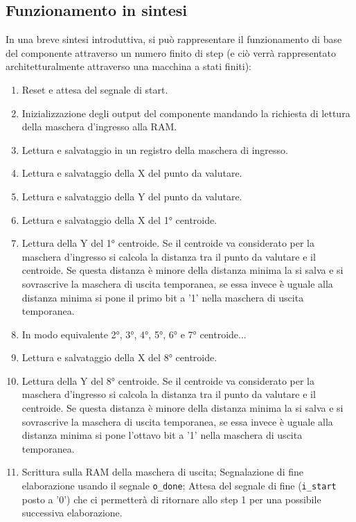 \documentclass{article}
\begin{document}
\subsection{Funzionamento in sintesi}
In una breve sintesi introduttiva, si può rappresentare il funzionamento di base del componente attraverso un numero finito di step (e ciò verrà rappresentato architetturalmente attraverso una macchina a stati finiti):
\begin{enumerate}
    \item Reset e attesa del segnale di start.
    \item Inizializzazione degli output del componente mandando la richiesta di lettura della maschera d'ingresso alla RAM.
    \item Lettura e salvataggio in un registro della maschera di ingresso.
    \item Lettura e salvataggio della X del punto da valutare.
    \item Lettura e salvataggio della Y del punto da valutare.
    \item Lettura e salvataggio della X del 1° centroide.
    \item Lettura della Y del 1° centroide. Se il centroide va considerato per la maschera d'ingresso si calcola la distanza tra il punto da valutare e il centroide. Se questa distanza è minore della distanza minima la si salva e si sovrascrive la maschera di uscita temporanea, se essa invece è uguale alla distanza minima si pone il primo bit a '1' nella maschera di uscita temporanea.
    \item In modo equivalente 2°, 3°, 4°, 5°, 6° e 7° centroide... \addtocounter{enumi}{11}
    \item Lettura e salvataggio della X del 8° centroide.
    \item Lettura della Y del 8° centroide. Se il centroide va considerato per la maschera d'ingresso si calcola la distanza tra il punto da valutare e il centroide. Se questa distanza è minore della distanza minima la si salva e si sovrascrive la maschera di uscita temporanea, se essa invece è uguale alla distanza minima si pone l'ottavo bit a '1' nella maschera di uscita temporanea.
    \item Scrittura sulla RAM della maschera di uscita; Segnalazione di fine elaborazione usando il segnale \verb^o_done^; Attesa del segnale di fine (\verb^i_start^ posto a '0') che ci permetterà di ritornare allo step 1 per una possibile successiva elaborazione.
\end{enumerate}
\end{document}
